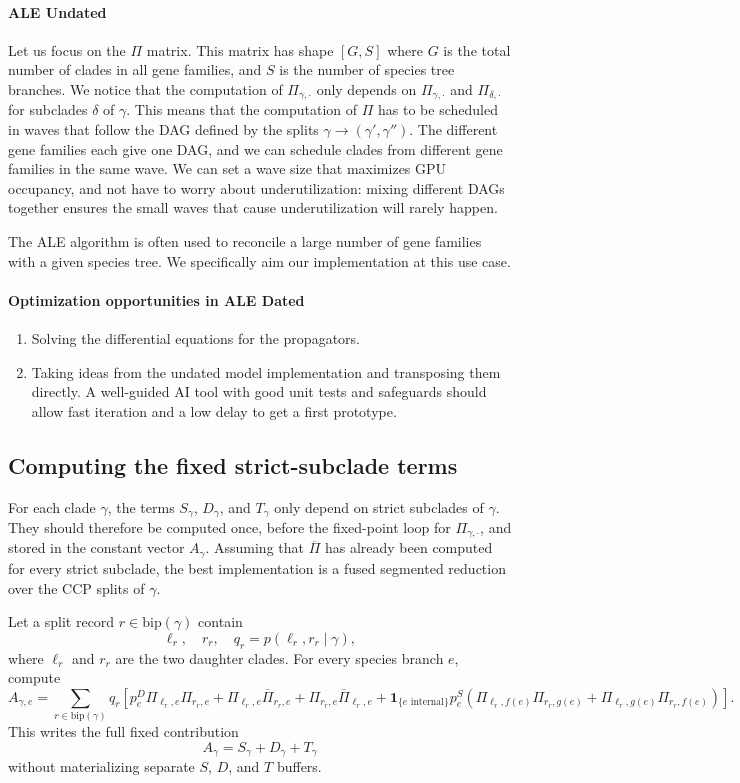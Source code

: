 \documentclass{article}
\newcommand{\1}{\mathbf{1}}
\newcommand{\bip}{\mathrm{bip}}
\newcommand{\Pibar}{\overline{\Pi}}
\begin{document}
\paragraph{ALE Undated}
Let us focus on the $\Pi$ matrix. This matrix has shape $[G, S]$ where $G$ is the total number of clades in all gene families, and $S$ is the number of species tree branches. We notice that the computation of $\Pi_{\gamma, \cdot}$ only depends on $\Pi_{\gamma, \cdot}$ and $\Pi_{\delta, \cdot}$ for subclades $\delta$ of $\gamma$. This means that the computation of $\Pi$ has to be scheduled in waves that follow the DAG defined by the splits $\gamma \to (\gamma', \gamma'')$. The different gene families each give one DAG, and we can schedule clades from different gene families in the same wave. We can set a wave size that maximizes GPU occupancy, and not have to worry about underutilization: mixing different DAGs together ensures the small waves that cause underutilization will rarely happen.

The ALE algorithm is often used to reconcile a large number of gene families with a given species tree. We specifically aim our implementation at this use case. 

\paragraph{Optimization opportunities in ALE Dated}
\begin{enumerate}
    \item Solving the differential equations for the propagators.
    \item Taking ideas from the undated model implementation and transposing them directly. A well-guided AI tool with good unit tests and safeguards should allow fast iteration and a low delay to get a first prototype.
\end{enumerate}
\subsection{Computing the fixed strict-subclade terms}
For each clade $\gamma$, the terms $S_\gamma$, $D_\gamma$, and $T_\gamma$ only depend on strict subclades of $\gamma$. They should therefore be computed once, before the fixed-point loop for $\Pi_{\gamma,\cdot}$, and stored in the constant vector $A_\gamma$. Assuming that $\Pibar$ has already been computed for every strict subclade, the best implementation is a fused segmented reduction over the CCP splits of $\gamma$.

Let a split record $r\in\bip(\gamma)$ contain
\[
    \ell_r,\quad r_r,\quad q_r=p(\ell_r,r_r\mid\gamma),
\]
where $\ell_r$ and $r_r$ are the two daughter clades. For every species branch $e$, compute
\[
    A_{\gamma,e}
    =
    \sum_{r\in\bip(\gamma)} q_r
    \left[
        p^D_e\Pi_{\ell_r,e}\Pi_{r_r,e}
        +
        \Pi_{\ell_r,e}\Pibar_{r_r,e}
        +
        \Pi_{r_r,e}\Pibar_{\ell_r,e}
        +
        \1_{\{e\text{ internal}\}}p^S_e
        \left(
            \Pi_{\ell_r,f(e)}\Pi_{r_r,g(e)}
            +
            \Pi_{\ell_r,g(e)}\Pi_{r_r,f(e)}
        \right)
    \right].
\]
This writes the full fixed contribution
\[
    A_\gamma=S_\gamma+D_\gamma+T_\gamma
\]
without materializing separate $S$, $D$, and $T$ buffers.
\end{document}
